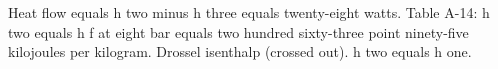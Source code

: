 Heat flow equals h two minus h three equals twenty-eight watts.  
Table A-14: h two equals h f at eight bar equals two hundred sixty-three point ninety-five kilojoules per kilogram.  
Drossel isenthalp (crossed out).  
h two equals h one.
